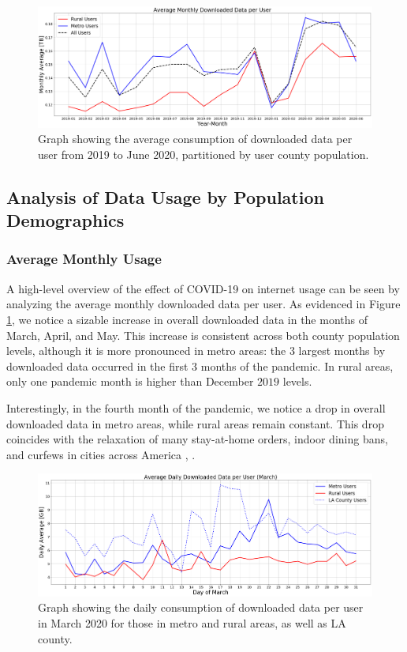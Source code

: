 \begin{figure}
\centering
\includegraphics[width=1.0\linewidth]{figs/monthly_downloaded_data.png}
\caption{Graph showing the average consumption of downloaded data per user from 2019 to June 2020, partitioned by user county population.}
\label{fig:downloadmetro_rural}
\end{figure}

\subsection{Analysis of Data Usage by Population Demographics}

\subsubsection{Average Monthly Usage}
A high-level overview of the effect of COVID-19 on internet usage can be seen by analyzing the average monthly downloaded data per user. As evidenced in Figure \ref{fig:downloadmetro_rural}, we notice a sizable increase in overall downloaded data in the months of March, April, and May. This increase is consistent across both county population levels, although it is more pronounced in metro areas: the 3 largest months by downloaded data occurred in the first 3 months of the pandemic. In rural areas, only one pandemic month is higher than December $2019$ levels.

Interestingly, in the fourth month of the pandemic, we notice a drop in overall downloaded data in metro areas, while rural areas remain constant. This drop coincides with the relaxation of many stay-at-home orders, indoor dining bans, and curfews in cities across America \cite{money2020la}, \cite{gov2020nyc}. 

\begin{figure}
\centering
\includegraphics[width=1.0\linewidth]{figs/daily_downloaded_data.png}
\caption{Graph showing the daily consumption of downloaded data per user in March 2020 for those in metro and rural areas, as well as LA county.}
\label{fig:dailymetro_rural}
\end{figure}

